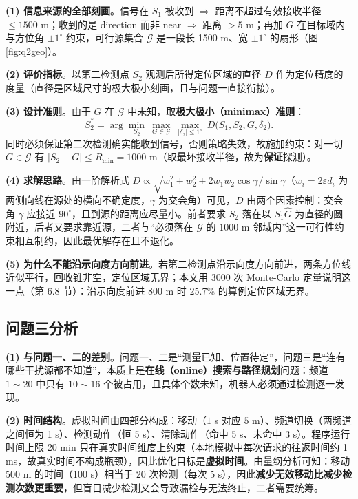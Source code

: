 \documentclass[withoutpreface,bwprint]{cumcmthesis}
\begin{document}
\textbf{(1) 信息来源的全部刻画}。信号在 $S_1$ 被收到 $\Rightarrow$ 距离不超过有效接收半径 $\le1500$ m；收到的是 direction 而非 near $\Rightarrow$ 距离 $>5$ m；再加 $G$ 在目标域内与方位角 $\pm1^{\circ}$ 约束，可行源集合 $\mathcal{G}$ 是一段长 1500 m、宽 $\pm1^{\circ}$ 的扇形（图 \ref{fig:q2geo}）。

\textbf{(2) 评价指标}。以第二检测点 $S_2$ 观测后所得定位区域的直径 $D$ 作为定位精度的度量（直径是区域尺寸的极大极小刻画，且与问题一直接衔接）。

\textbf{(3) 设计准则}。由于 $G$ 在 $\mathcal{G}$ 中未知，取\textbf{极大极小（minimax）准则}：
\begin{equation}
S_2^{*}=\arg\min_{S_2}\ \max_{G\in\mathcal{G}}\ \max_{|\delta_2|\le1^{\circ}}\ D\bigl(S_1,S_2,G,\delta_2\bigr).
\label{eq:q2minimax}
\end{equation}
同时必须保证第二次检测确实能收到信号，否则策略失效，故施加约束：对一切 $G\in\mathcal{G}$ 有 $|S_2-G|\le R_{\min}=1000$ m（取最坏接收半径，故为\textbf{保证}探测）。

\textbf{(4) 求解思路}。由一阶解析式 $D\propto\sqrt{w_1^2+w_2^2+2w_1w_2\cos\gamma}/\sin\gamma$（$w_i=2\varepsilon d_i$ 为两侧向线在源处的横向不确定度，$\gamma$ 为交会角）可见，$D$ 由两个因素控制：交会角 $\gamma$ 应接近 $90^{\circ}$，且到源的距离应尽量小。前者要求 $S_2$ 落在以 $S_1\widehat{G}$ 为直径的圆附近，后者又要求靠近源，二者与“必须落在 $\mathcal{G}$ 的 $1000$ m 邻域内”这一可行性约束相互制约，因此最优解存在且不退化。

\textbf{(5) 为什么不能沿示向度方向前进}。若第二检测点沿示向度方向前进，两条方位线近似平行，回收锥非空，定位区域无界；本文用 3000 次 Monte-Carlo 定量说明这一点（第 6.8 节）：沿示向度前进 800 m 时 25.7\% 的算例定位区域无界。

\subsection{问题三分析}

\textbf{(1) 与问题一、二的差别}。问题一、二是“测量已知、位置待定”，问题三是“连有哪些干扰源都不知道”，本质上是\textbf{在线（online）搜索与路径规划}问题：频道 $1\sim20$ 中只有 $10\sim16$ 个被占用，且具体个数未知，机器人必须通过检测逐一发现。

\textbf{(2) 时间结构}。虚拟时间由四部分构成：移动（$1$ s 对应 $5$ m）、频道切换（两频道之间恒为 1 s）、检测动作（恒 5 s）、清除动作（命中 5 s、未命中 3 s）。程序运行时间上限 20 min 只在真实时间维度上约束（本地模拟中每次请求的往返时间约 1 ms，故真实时间不构成瓶颈），因此优化目标是\textbf{虚拟时间}。由量纲分析可知：移动 500 m 的时间（100 s）相当于 20 次检测（每次 5 s），因此\textbf{减少无效移动比减少检测次数更重要}，但盲目减少检测又会导致漏检与无法终止，二者需要统筹。
\end{document}
